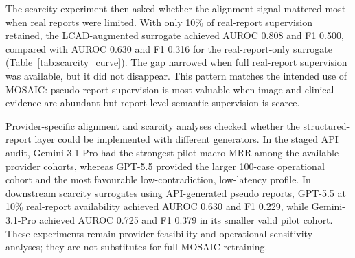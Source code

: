 The scarcity experiment then asked whether the alignment signal mattered most when real reports were limited. With only 10\% of real-report supervision retained, the LCAD-augmented surrogate achieved AUROC 0.808 and F1 0.500, compared with AUROC 0.630 and F1 0.316 for the real-report-only surrogate (Table~\ref{tab:scarcity_curve}). The gap narrowed when full real-report supervision was available, but it did not disappear. This pattern matches the intended use of MOSAIC: pseudo-report supervision is most valuable when image and clinical evidence are abundant but report-level semantic supervision is scarce.

Provider-specific alignment and scarcity analyses checked whether the structured-report layer could be implemented with different generators. In the staged API audit, Gemini-3.1-Pro had the strongest pilot macro MRR among the available provider cohorts, whereas GPT-5.5 provided the larger 100-case operational cohort and the most favourable low-contradiction, low-latency profile. In downstream scarcity surrogates using API-generated pseudo reports, GPT-5.5 at 10\% real-report availability achieved AUROC 0.630 and F1 0.229, while Gemini-3.1-Pro achieved AUROC 0.725 and F1 0.379 in its smaller valid pilot cohort. These experiments remain provider feasibility and operational sensitivity analyses; they are not substitutes for full MOSAIC retraining.

\begin{table}[!htbp]
  \centering
  \caption{Report-supervision scarcity curve using a lightweight downstream surrogate.}
  \label{tab:scarcity_curve}
  \scriptsize
  \begin{threeparttable}
  \end{threeparttable}
\end{table}

